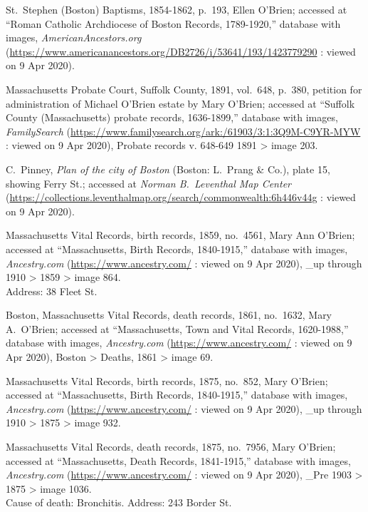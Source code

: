 \begin{thebibliography}{99}
	St.\ Stephen (Boston) Baptisms, 1854-1862, p.\ 193, Ellen O'Brien; accessed at ``Roman Catholic Archdiocese of Boston Records, 1789-1920,'' database with images, \textit{AmericanAncestors.org} (\url{https://www.americanancestors.org/DB2726/i/53641/193/1423779290} : viewed on 9 Apr 2020).
	
	Massachusetts Probate Court, Suffolk County, 1891, vol.\ 648, p.\ 380, petition for administration of Michael O'Brien estate by Mary O'Brien; accessed at ``Suffolk County (Massachusetts) probate records, 1636-1899,'' database with images, \textit{FamilySearch} (\url{https://www.familysearch.org/ark:/61903/3:1:3Q9M-C9YR-MYW} : viewed on 9 Apr 2020), Probate records v. 648-649 1891 > image 203.
	
	C.\ Pinney, \textit{Plan of the city of Boston} (Boston: L.\ Prang \& Co.), plate 15, showing Ferry St.; accessed at \textit{Norman B.\ Leventhal Map Center} (\url{https://collections.leventhalmap.org/search/commonwealth:6h446v44g} : viewed on 9 Apr 2020).	
	
	Massachusetts Vital Records, birth records, 1859, no.\ 4561, Mary Ann O'Brien; accessed at ``Massachusetts, Birth Records, 1840-1915,'' database with images, \textit{Ancestry.com} (\url{https://www.ancestry.com/} : viewed on 9 Apr 2020), \_up through 1910 > 1859 > image 864.\\
	Address: 38 Fleet St.
	
	Boston, Massachusetts Vital Records, death records, 1861, no.\ 1632, Mary A.\ O'Brien; accessed at ``Massachusetts, Town and Vital Records, 1620-1988,'' database with images, \textit{Ancestry.com} (\url{https://www.ancestry.com/} : viewed on 9 Apr 2020), Boston > Deaths, 1861 > image 69.
	
	Massachusetts Vital Records, birth records, 1875, no.\ 852, Mary O'Brien; accessed at ``Massachusetts, Birth Records, 1840-1915,'' database with images, \textit{Ancestry.com} (\url{https://www.ancestry.com/} : viewed on 9 Apr 2020), \_up through 1910 > 1875 > image 932.
	
	Massachusetts Vital Records, death records, 1875, no.\ 7956, Mary O'Brien; accessed at ``Massachusetts, Death Records, 1841-1915,'' database with images, \textit{Ancestry.com} (\url{https://www.ancestry.com/} : viewed on 9 Apr 2020), \_Pre 1903 > 1875 > image 1036.\\
	Cause of death: Bronchitis. Address: 243 Border St.
	

\end{thebibliography}
